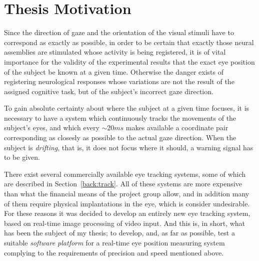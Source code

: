 \section{Thesis Motivation}
\label{intro:motivation}

Since the direction of gaze and the orientation of the visual stimuli
have to correspond as exactly as possible, in order to be certain that
exactly those neural assemblies are stimulated whose activity is being
registered, it is of vital importance for the validity of the
experimental results that the exact eye position of the subject be
known at a given time.  Otherwise the danger exists of registering
neurological responses whose variations are not the result of the
assigned cognitive task, but of the subject's incorrect gaze
direction.

To gain absolute certainty about where the subject at a given time
focuses, it is necessary to have a system which continuously tracks
the movements of the subject's eyes, and which every $\sim 20 ms$
makes available a coordinate pair corresponding as closesly as
possible to the actual gaze direction.  When the subject is {\em
  drifting\/}, that is, it does not focus where it should, a warning
signal has to be given.

There exist several commercially available eye tracking systems, some
of which are described in Section~\ref{back:track}.  All of these
systems are more expensive than what the financial means  of the project group allow, and in
addition many of them require physical implantations in the eye, which
is consider undesirable.  For these reasons it was decided to develop
an entirely new eye tracking system, based on real-time image
processing of video input.  And this is, in short, what has been the
subject of my thesis; to develop, and, as far as possible, test a
suitable {\em software platform\/} for a real-time eye position
measuring system complying to the requirements of precision and speed
mentioned above.



